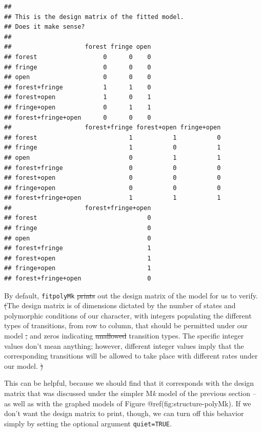 \documentclass[fleqn,10pt,lineno]{wlpeerj}
\providecommand{\DIFaddtex}[1]{{\protect\color{blue}\uwave{#1}}} %
\providecommand{\DIFdeltex}[1]{{\protect\color{red}\sout{#1}}}                      %
\providecommand{\DIFaddbegin}{} %
\providecommand{\DIFaddend}{} %
\providecommand{\DIFdelbegin}{} %
\providecommand{\DIFdelend}{} %
\providecommand{\DIFadd}[1]{\texorpdfstring{\DIFaddtex{#1}}{#1}} %
\providecommand{\DIFdel}[1]{\texorpdfstring{\DIFdeltex{#1}}{}} %
\newcommand{\DIFscaledelfig}{0.5}
\newlength{\DIFdelgraphicswidth} %
\newlength{\DIFdelgraphicsheight} %
\newcommand{\DIFaddincludegraphics}[2][]{{\color{blue}\fbox{\DIFOincludegraphics[#1]{#2}}}} %
\newcommand{\DIFdelincludegraphics}[2][]{%
\sbox{\DIFdelgraphicsbox}{\DIFOincludegraphics[#1]{#2}}%
\settoboxwidth{\DIFdelgraphicswidth}{\DIFdelgraphicsbox} %
\settoboxtotalheight{\DIFdelgraphicsheight}{\DIFdelgraphicsbox} %
\scalebox{\DIFscaledelfig}{%
\parbox[b]{\DIFdelgraphicswidth}{\usebox{\DIFdelgraphicsbox}\\[-\baselineskip] \rule{\DIFdelgraphicswidth}{0em}}\llap{\resizebox{\DIFdelgraphicswidth}{\DIFdelgraphicsheight}{%
\setlength{\unitlength}{\DIFdelgraphicswidth}%
\begin{picture}(1,1)%
\thicklines\linethickness{2pt} %
{\color[rgb]{1,0,0}\put(0,0){\framebox(1,1){}}}%
{\color[rgb]{1,0,0}\put(0,0){\line( 1,1){1}}}%
{\color[rgb]{1,0,0}\put(0,1){\line(1,-1){1}}}%
\end{picture}%
}\hspace*{3pt}}} %
} %
\DeclareRobustCommand{\DIFaddbegin}{\DIFOaddbegin \let\includegraphics\DIFaddincludegraphics} %
\DeclareRobustCommand{\DIFaddend}{\DIFOaddend \let\includegraphics\DIFOincludegraphics} %
\DeclareRobustCommand{\DIFdelbegin}{\DIFOdelbegin \let\includegraphics\DIFdelincludegraphics} %
\DeclareRobustCommand{\DIFdelend}{\DIFOaddend \let\includegraphics\DIFOincludegraphics} %
\begin{document}
\begin{verbatim}
## 
## This is the design matrix of the fitted model.
## Does it make sense?
## 
##                    forest fringe open
## forest                  0      0    0
## fringe                  0      0    0
## open                    0      0    0 
## forest+fringe           1      1    0
## forest+open             1      0    1
## fringe+open             0      1    1
## forest+fringe+open      0      0    0
##                    forest+fringe forest+open fringe+open
## forest                         1           1           0
## fringe                         1           0           1
## open                           0           1           1
## forest+fringe                  0           0           0
## forest+open                    0           0           0
## fringe+open                    0           0           0
## forest+fringe+open             1           1           1
##                    forest+fringe+open
## forest                              0
## fringe                              0
## open                                0
## forest+fringe                       1
## forest+open                         1
## fringe+open                         1
## forest+fringe+open                  0
\end{verbatim}

By default, \texttt{fitpolyMk} \DIFdelbegin \DIFdel{prints }\DIFdelend \DIFaddbegin \DIFadd{begins by printing }\DIFaddend out the design matrix
of the model for us to verify. \DIFdelbegin \DIFdel{(}\DIFdelend The design matrix is of dimensions
dictated by the number of states and polymorphic conditions of our
character, with integers populating the different types of transitions,
from row to column, that should be permitted under our model \DIFdelbegin \DIFdel{, }\DIFdelend \DIFaddbegin \DIFadd{-- }\DIFaddend and
zeros indicating \DIFdelbegin \DIFdel{unallowed }\DIFdelend \DIFaddbegin \DIFadd{disallowed }\DIFaddend transition types. The specific integer
values don't mean anything; however, different integer values imply that
the corresponding transitions will be allowed to take place with
different rates under our model.
\DIFdelbegin \DIFdel{)
}\DIFdelend 

This can be helpful, because we should find that it corresponds with the
design matrix that was discussed under the simpler M\emph{k} model of
the previous section -- as well as with the graphed models of Figure
@ref(fig:structure-polyMk). If we don't want the design matrix to print,
though, we can turn off this behavior simply by setting the optional
argument \texttt{quiet=TRUE}. \DIFdelbegin %
\end{document}
